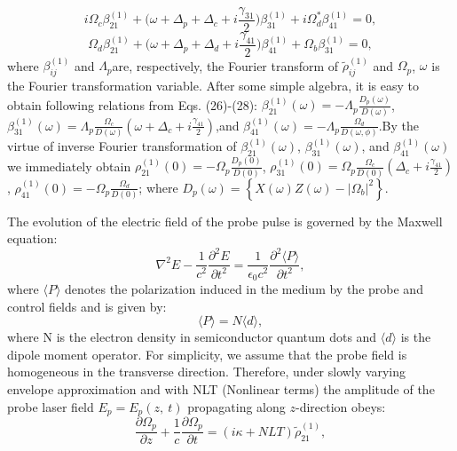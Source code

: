 \documentclass[12pt,a4paper]{article}
\begin{document}
\begin{equation}
    i\Omega_c\beta_{21}^{(1)}+
    \big(\omega+\Delta_p+\Delta_c+i\frac{\gamma_{31}}{2}\big)\beta_{31}^{(1)}+i\Omega_d^*\beta_{41}^{(1)}=0,
\end{equation}
\begin{equation}
    \Omega_d\beta_{21}^{(1)}+
    \big(\omega+\Delta_p+\Delta_d+i\frac{\gamma_{41}}{2}\big)\beta_{41}^{(1)}+\Omega_b\beta_{31}^{(1)}=0,
\end{equation}
where $\beta^{(1)}_{ij}$ and $\Lambda_p$are, respectively, the Fourier transform of $\tilde\rho^{(1)}_{ij}$ and $\Omega_p$, $\omega$ is the Fourier transformation variable. After some simple algebra, it is easy to obtain following relations from Eqs. (26)-(28): $\beta^{(1)}_{21}(\omega)=-\Lambda_p{\frac{D_p(\omega)}{D(\omega)}}$, $\beta^{(1)}_{31}(\omega)=\Lambda_p\frac{\Omega_c}{D(\omega)}(\omega+\Delta_c+i\frac{\gamma_{41}}{2})$,and $\beta^{(1)}_{41}(\omega)=-\Lambda_p{\frac{\Omega_{d}}{D(\omega,\phi)}}$.By the virtue of inverse Fourier transformation of $\beta^{(1)}_{21}(\omega)$, $\beta^{(1)}_{31}(\omega)$, and $\beta^{(1)}_{41}(\omega)$ we immediately obtain ${\rho^{(1)}_{21}(0)}=-\Omega_p{\frac{D_p(0)}{D{(0)}}}$, ${\rho^{(1)}_{31}(0)}=\Omega_p\frac{\Omega_c}{D{(0)}}(\Delta_c+i\frac{\gamma_{41}}{2})$, ${\rho^{(1)}_{41}(0)}=-\Omega_p{\frac{\Omega_{d}}{D{(0)}}}$; where $D_p{(\omega)} = \left\lbrace X{(\omega)}Z{(\omega)}-{\vert{\Omega_b}\vert}^{2}\right\rbrace$.\par
The evolution of the electric field of the probe pulse is governed by the Maxwell
equation:
\begin{equation}
    \nabla^2E-\frac{1}{c^2}\frac{\partial^2E}{\partial t^2}=\frac{1}{\epsilon_0c^2}\frac{\partial^2\langle P\rangle}{\partial t^2},
\end{equation}
where \(\langle P\rangle\) denotes the polarization induced in the medium by the probe and control fields and is given by:
\begin{equation}
    \langle P\rangle=N\langle d\rangle,
\end{equation}
where N is the electron density in semiconductor quantum dots and \(\langle d\rangle\) is the dipole moment operator. For simplicity, we assume that the probe field is homogeneous in the transverse direction. Therefore, under slowly varying envelope approximation and with NLT (Nonlinear terms) the amplitude of the probe laser field \(E_p=E_p(z,\ t)\) propagating along \(z\)-direction obeys:
\begin{equation}
    \frac{\partial\Omega_p}{\partial z}+\frac{1}{c}\frac{\partial\Omega_p}{\partial t}=(i\kappa+NLT)\tilde\rho_{21}^{(1)},
\end{equation}
\end{document}
